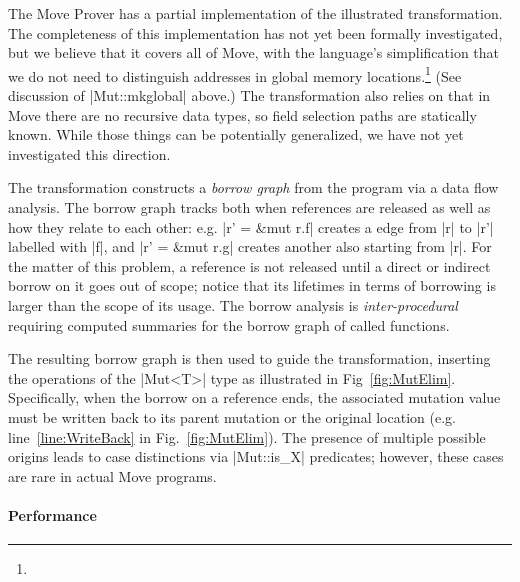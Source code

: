  The Move Prover has a partial implementation of the
illustrated transformation.  The completeness of this implementation has not yet
been formally investigated, but we believe that it covers all of Move, with the
language's simplification that we do not need to distinguish addresses in global
memory locations.\footnote{} (See
discussion of |Mut::mkglobal| above.) The transformation also relies on that in
Move there are no recursive data types, so field selection paths are statically
known. While those things can be potentially generalized, we have not yet
investigated this direction.

The transformation constructs a \emph{borrow graph} from the program via a data
flow analysis. The borrow graph tracks both when references are released as well
as how they relate to each other: e.g. |r' = &mut r.f| creates a edge from |r|
to |r'| labelled with |f|, and |r' = &mut r.g| creates another also starting
from |r|. For the matter of this problem, a reference is not released until a
direct or indirect borrow on it goes out of scope; notice that its lifetimes in
terms of borrowing is larger than the scope of its usage. The borrow analysis is
\emph{inter-procedural} requiring computed summaries for the borrow graph of
called functions.

The resulting borrow graph is then used to guide the transformation, inserting
the operations of the |Mut<T>| type as illustrated in
Fig~\ref{fig:MutElim}. Specifically, when the borrow on a reference ends, the
associated mutation value must be written back to its parent mutation or the
original location (e.g. line~\ref{line:WriteBack} in
Fig.~\ref{fig:MutElim}). The presence of multiple possible origins leads to case
distinctions via |Mut::is_X| predicates; however, these cases are rare in actual
Move programs.

\paragraph{Performance}




